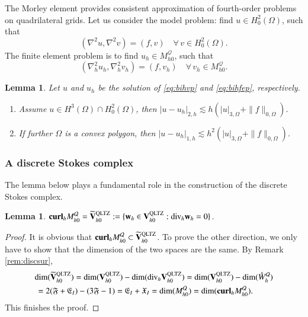 \documentclass[12pt,showkeys]{amsart}
\newtheorem{lemma}[theorem]{Lemma}
\begin{document}
The Morley element provides consistent approximation of fourth-order problems on quadrilateral grids. Let us consider the model problem: find $u\in H^2_0(\Omega)$, such that
\begin{equation}\label{eq:bihvp}
(\nabla^2u,\nabla^2v)=(f,v)\quad \forall\,v\in H^2_0(\Omega).
\end{equation}
The finite element problem is to find $u_h\in M_{h0}^{\mathcal{Q}}$, such that
\begin{equation}\label{eq:bihfep}
(\nabla_h^2u_h,\nabla_h^2v_h)=(f,v_h)\quad\forall\,v_h\in M_{h0}^{\mathcal{Q}}.
\end{equation}
\begin{lemma}\label{lem:parksheen}\cite{Park.C;Sheen.D2013}
Let $u$ and $u_h$ be the solution of \eqref{eq:bihvp} and \eqref{eq:bihfep}, respectively.
\begin{enumerate}
\item Assume $u\in H^3(\Omega)\cap H^2_0(\Omega)$, then $|u-u_h|_{2,h}\lesssim h(|u|_{3,\Omega}+\|f\|_{0,\Omega})$.
\item If further $\Omega$ is a convex polygon, then $|u-u_h|_{1,h}\lesssim h^2(|u|_{3,\Omega}+\|f\|_{0,\Omega})$.
\end{enumerate}
\end{lemma}

\subsubsection{A discrete Stokes complex}

The lemma below plays a fundamental role in the construction of the discrete Stokes complex.
\begin{lemma}\label{lem:nullembd}
$\mathbf{curl}_h M_{h0}^{\mathcal{Q}}=\widetilde{\mathbf{V}}_{h0}^{\rm QLTZ}:=\{\mathbf{w}_h\in\mathbf{V}_{h0}^{\rm QLTZ}:\mathrm{div}_h\mathbf{w}_h=0\}$.
\end{lemma}
\begin{proof}
It is obvious that $\textbf{curl}_h M_{h0}^{\mathcal{Q}}\subset \widetilde{\mathbf{V}}_{h0}^{\rm QLTZ}$. To prove the other direction, we only have to show that the dimension of the two spaces are the same.  By Remark \ref{rem:discsur}, 
\begin{multline*}
\dim(\widetilde{\mathbf{V}}_{h0}^{\rm QLTZ})=\dim(\mathbf{V}_{h0}^{\rm QLTZ})-\dim(\mathrm{div}_h\mathbf{V}_{h0}^{\rm QLTZ})=\dim(\mathbf{V}_{h0}^{\rm QLTZ})-\dim(\mathring{W}_h^{\mathcal{Q}}) \\ 
=2(\mathfrak{F}+\mathfrak{E}_I)-(3\mathfrak{F}-1)=\mathfrak{E}_I+\mathfrak{X}_I=\dim(M_{h0}^{\mathcal{Q}})=\dim(\mathbf{curl}_hM_{h0}^{\mathcal{Q}}).\qquad
\end{multline*}
This finishes the proof.
\end{proof}
\end{document}
